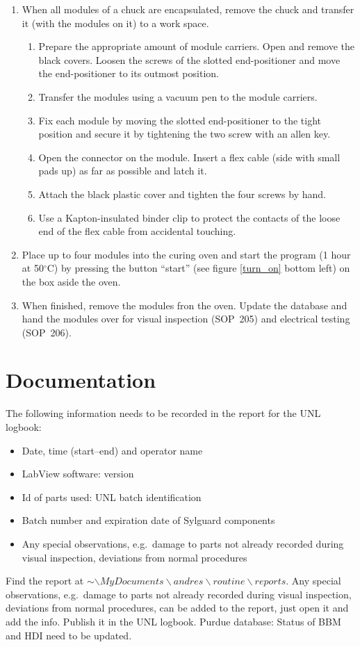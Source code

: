 \documentclass[12pt]{unlsilabsop}
\begin{document}
\begin{enumerate}
    \item When all modules of a chuck are encapsulated, remove the chuck and transfer it (with the modules on it) to a work space.
    \begin{enumerate}
        \item Prepare the appropriate amount of module carriers. Open and remove the black covers. Loosen the screws of the slotted end-positioner and move the end-positioner to its outmost position.
        \item Transfer the modules using a vacuum pen to the module carriers.
        \item Fix each module by moving the slotted end-positioner to the tight position and secure it by tightening the two screw with an allen key.
        \item Open the connector on the module. Insert a flex cable (side with small pads up) as far as possible and latch it.
        \item Attach the black plastic cover and tighten the four screws by hand.
        \item Use a Kapton-insulated binder clip to protect the contacts of the loose end of the flex cable from accidental touching.
    \end{enumerate}
    \item Place up to four modules into the curing oven and start the program (1 hour at 50$^\circ$C) by pressing the button ``start'' (see figure \ref{turn_on} bottom left) on the box aside the oven.
    \item When finished, remove the modules fron the oven. Update the database and hand the modules over for visual inspection (SOP~205) and electrical testing (SOP~206).
\end{enumerate}

\section{Documentation}
The following information needs to be recorded in the report for the UNL logbook:
\begin{itemize}
    \item Date, time (start--end) and operator name
    \item LabView software: version
    \item Id of parts used: UNL batch identification
    \item Batch number and expiration date of Sylguard components
    \item Any special observations, e.g.~damage to parts not already recorded during visual inspection, deviations from normal procedures
\end{itemize}

Find the report at $\sim\backslash MyDocuments\backslash andres\backslash routine\backslash reports$. Any special observations, e.g.~damage to parts not already recorded during visual inspection, deviations from normal procedures, can be added to the report, just open it and add the info. Publish it in the UNL logbook. 
Purdue database: Status of BBM and HDI need to be updated.
\end{document}
